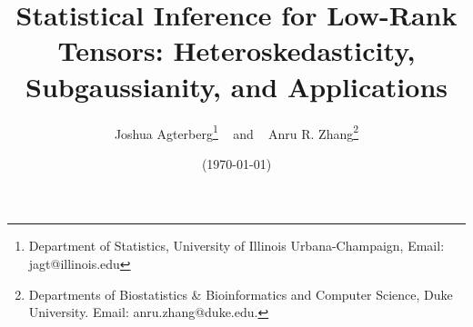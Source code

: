 \documentclass[10pt]{article}
\newcommand{\0}{{\mathbf{0}}}
\newcommand{\1}{{\mathbf{1}}}
\begin{document}
\title{%
Statistical Inference for Low-Rank Tensors: Heteroskedasticity, Subgaussianity, and Applications}
\author{Joshua Agterberg\thanks{Department of Statistics, University of Illinois Urbana-Champaign, Email: jagt@illinois.edu} ~ and ~ Anru R. Zhang\thanks{Departments of Biostatistics \& Bioinformatics and Computer Science, Duke University. Email: anru.zhang@duke.edu.}}

\date{(\today)}



\maketitle




\end{document}
